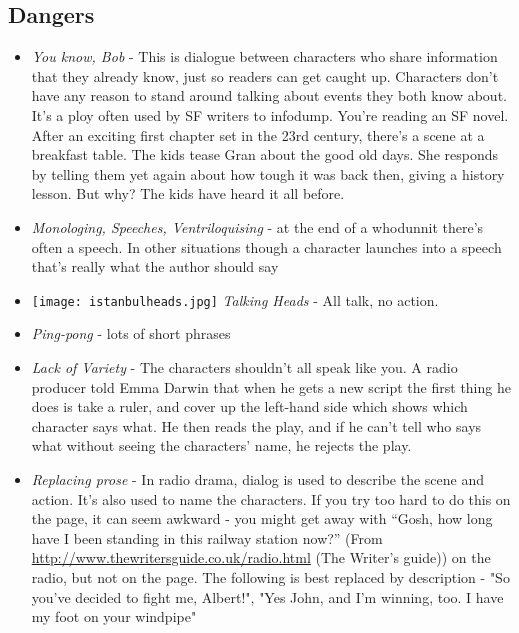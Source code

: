 \documentclass[11pt]{article}
\begin{document}
\subsection*{Dangers}
\begin{itemize}

\item \textit{You know, Bob} - 
This is dialogue between characters who share information that they already know, just so readers can get caught up.  Characters don’t have any reason to stand around talking about events they both know about. It's a ploy often used by SF writers to infodump. You're reading an SF novel. After an exciting first chapter set in the 23rd century, there's a scene at a breakfast table. The kids tease Gran about the good old days. She responds by telling them yet again about how tough it was back then, giving a history lesson. But why? The kids have heard it all before.

\item \textit{Monologing, Speeches, Ventriloquising} - at the end of a whodunnit there's often a speech. In other situations though a character launches into a speech that's really what the author should say

\item \texttt{[image: istanbulheads.jpg]} \textit{Talking Heads} - All talk, no action.

\item \textit{Ping-pong} - lots of short phrases
\item \textit{Lack of Variety} - The characters shouldn't all speak like you. A radio producer told Emma Darwin  that when he gets a new script the first thing he does is take a ruler, and cover up the left-hand side which shows which character says what. He then reads the play, and if he can't tell who says what without seeing the characters' name, he rejects the play. 

\item \textit{Replacing prose} - In radio drama, dialog is used to describe the scene and action. It's also used to name the characters. If you try too hard to do this on the page, it can seem awkward - you might get away with “Gosh, how long have I been standing in this railway station now?” (From \url{http://www.thewritersguide.co.uk/radio.html} (The Writer's guide)) on the radio, but not on the page. The following is best replaced by description -
"So you’ve decided to fight me, Albert!", "Yes John, and I’m winning, too. I have my foot on your windpipe"

 \end{itemize}
\end{document}
